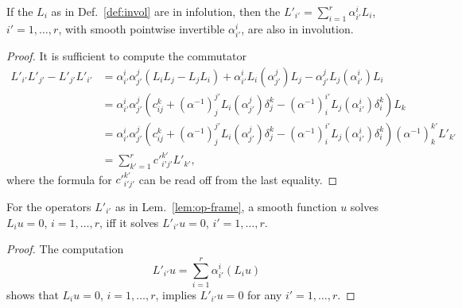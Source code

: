 \begin{lemma} \label{lem:op-frame}
If the $L_i$ as in Def.~\ref{def:invol} are in infolution, then the $L'_{i'} =
\sum_{i=1}^r \alpha_{i'}^i L_i$, $i'=1,\ldots,r$, with smooth pointwise invertible
$\alpha_{i'}^i$, are also in involution.
\end{lemma}
\begin{proof}
It is sufficient to compute the commutator
\begin{align*}
  L'_{i'} L'_{j'} - L'_{j'} L'_{i'}
  &= \alpha_{i'}^i \alpha_{j'}^j (L_i L_j - L_j L_i)
    + \alpha_{i'}^i L_i(\alpha_{j'}^j) L_j
    - \alpha_{j'}^j L_j(\alpha_{i'}^i) L_i
  \\
  &= \alpha_{i'}^i \alpha_{j'}^j \left(c_{ij}^k
    + (\alpha^{-1})_j^{j'} L_i(\alpha_{j'}^j) \delta_j^k
    - (\alpha^{-1})_i^{i'} L_j(\alpha_{i'}^i) \delta_i^k \right) L_k
  \\
  &= \alpha_{i'}^i \alpha_{j'}^j \left(c_{ij}^k
    + (\alpha^{-1})_j^{j'} L_i(\alpha_{j'}^j) \delta_j^k
    - (\alpha^{-1})_i^{i'} L_j(\alpha_{i'}^i) \delta_i^k \right) (\alpha^{-1})_k^{k'} L'_{k'}
  \\
  &= \sum_{k'=1}^r c'^{k'}_{i'j'} L'_{k'} ,
\end{align*}
where the formula for $c'^{k'}_{i'j'}$ can be read off from the last equality.
\end{proof}

\begin{lemma} \label{lem:eq-frame-equiv}
For the operators $L'_{i'}$ as in Lem.~\ref{lem:op-frame}, a smooth function $u$
solves $L_i u = 0$, $i=1,\ldots,r$, iff it solves $L'_{i'} u = 0$,
$i'=1,\ldots,r$.
\end{lemma}
\begin{proof}
The computation
\[
  L'_{i'} u = \sum_{i=1}^r \alpha_{i'}^i (L_i u)
\]
shows that $L_i u = 0$, $i=1,\ldots,r$, implies $L'_{i'} u = 0$ for any $i'=1,\ldots,r$.
\end{proof}

